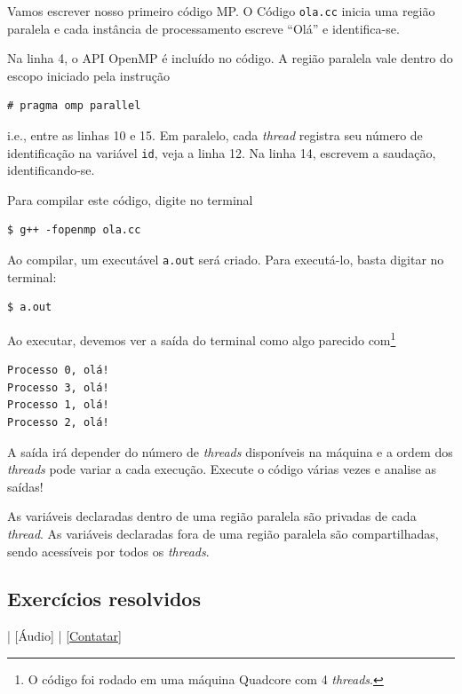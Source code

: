 Vamos escrever nosso primeiro código MP. O Código \verb+ola.cc+ inicia uma região paralela e cada instância de processamento escreve ``Olá'' e identifica-se.



Na linha 4, o API OpenMP é incluído no código. A região paralela vale dentro do escopo iniciado pela instrução
\begin{verbatim}
# pragma omp parallel
\end{verbatim}
i.e., entre as linhas 10 e 15. Em paralelo, cada {\it thread} registra seu número de identificação na variável \verb+id+, veja a linha 12. Na linha 14, escrevem a saudação, identificando-se.

Para compilar este código, digite no terminal
\begin{verbatim}
$ g++ -fopenmp ola.cc
\end{verbatim}

Ao compilar, um executável \verb+a.out+ será criado. Para executá-lo, basta digitar no terminal:
\begin{verbatim}
$ a.out
\end{verbatim}

Ao executar, devemos ver a saída do terminal como algo parecido com\footnote{O código foi rodado em uma máquina Quadcore com 4 {\it threads}.}
\begin{verbatim}
Processo 0, olá!
Processo 3, olá!
Processo 1, olá!
Processo 2, olá!
\end{verbatim}

A saída irá depender do número de {\it threads} disponíveis na máquina e a ordem dos {\it threads} pode variar a cada execução. Execute o código várias vezes e analise as saídas!

\begin{obs}
  As variáveis declaradas dentro de uma região paralela são privadas de cada {\it thread}. As variáveis declaradas fora de uma região paralela são compartilhadas, sendo acessíveis por todos os {\it threads}.
\end{obs}

\subsection*{Exercícios resolvidos}

\begin{flushright}
  [Vídeo] | [Áudio] | \href{https://phkonzen.github.io/notas/contato.html}{[Contatar]}
\end{flushright}


